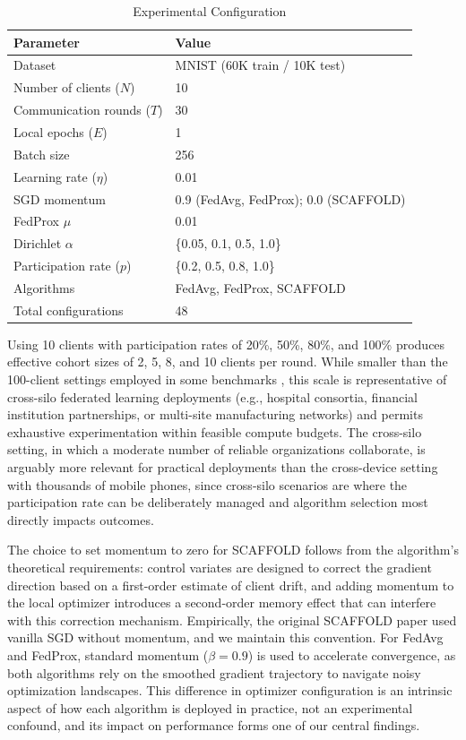 \documentclass[conference]{IEEEtran}
\begin{document}
\begin{table}[htbp]
\caption{Experimental Configuration}
\label{tab:config}
\centering
\begin{tabular}{ll}
\toprule
\textbf{Parameter} & \textbf{Value} \\
\midrule
Dataset & MNIST (60K train / 10K test) \\
Number of clients ($N$) & 10 \\
Communication rounds ($T$) & 30 \\
Local epochs ($E$) & 1 \\
Batch size & 256 \\
Learning rate ($\eta$) & 0.01 \\
SGD momentum & 0.9 (FedAvg, FedProx); 0.0 (SCAFFOLD) \\
FedProx $\mu$ & 0.01 \\
Dirichlet $\alpha$ & \{0.05, 0.1, 0.5, 1.0\} \\
Participation rate ($p$) & \{0.2, 0.5, 0.8, 1.0\} \\
Algorithms & FedAvg, FedProx, SCAFFOLD \\
Total configurations & 48 \\
\bottomrule
\end{tabular}
\end{table}

Using 10 clients with participation rates of 20\%, 50\%, 80\%, and 100\% produces effective cohort sizes of 2, 5, 8, and 10 clients per round. While smaller than the 100-client settings employed in some benchmarks \cite{li2022niid}, this scale is representative of cross-silo federated learning deployments (e.g., hospital consortia, financial institution partnerships, or multi-site manufacturing networks) and permits exhaustive experimentation within feasible compute budgets. The cross-silo setting, in which a moderate number of reliable organizations collaborate, is arguably more relevant for practical deployments than the cross-device setting with thousands of mobile phones, since cross-silo scenarios are where the participation rate can be deliberately managed and algorithm selection most directly impacts outcomes.

The choice to set momentum to zero for SCAFFOLD follows from the algorithm's theoretical requirements: control variates are designed to correct the gradient direction based on a first-order estimate of client drift, and adding momentum to the local optimizer introduces a second-order memory effect that can interfere with this correction mechanism. Empirically, the original SCAFFOLD paper \cite{karimireddy2020scaffold} used vanilla SGD without momentum, and we maintain this convention. For FedAvg and FedProx, standard momentum ($\beta = 0.9$) is used to accelerate convergence, as both algorithms rely on the smoothed gradient trajectory to navigate noisy optimization landscapes. This difference in optimizer configuration is an intrinsic aspect of how each algorithm is deployed in practice, not an experimental confound, and its impact on performance forms one of our central findings.
\end{document}

